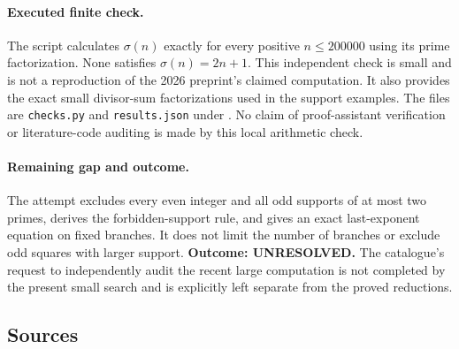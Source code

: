 \documentclass[11pt,a4paper]{article}
\begin{document}
\paragraph{Executed finite check.}
The script calculates $\sigma(n)$ exactly for every positive
$n\le200000$ using its prime factorization. None satisfies
$\sigma(n)=2n+1$. This independent check is small and is not a
reproduction of the 2026 preprint's claimed computation. It also
provides the exact small divisor-sum factorizations used in the support
examples. The files are \texttt{checks.py} and \texttt{results.json}
under .
No claim of proof-assistant verification or literature-code auditing
is made by this local arithmetic check.

\paragraph{Remaining gap and outcome.}
The attempt excludes every even integer and all odd supports of at
most two primes, derives the forbidden-support rule, and gives an exact
last-exponent equation on fixed branches. It does not limit the number
of branches or exclude odd squares with larger support.
\textbf{Outcome: UNRESOLVED.} The catalogue's request to independently
audit the recent large computation is not completed by the present
small search and is explicitly left separate from the proved reductions.

\subsection{Sources}
\end{document}
